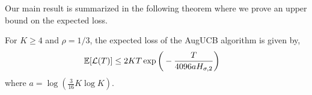 %


Our main result is summarized in the following theorem where we prove an  upper bound on the expected loss. 
\begin{theorem}
\label{Result:Theorem:1}
For $K\geq 4$ and
$\rho={1}/{3}$,
the expected loss of the AugUCB algorithm is given by,
\begin{align*}
\mathbb{E}[\mathcal{L}(T)]
& \leq 2KT
 \exp\bigg(- \frac{T}{4096 aH_{\sigma,2}} \bigg)
\end{align*}
where $a=\log(\frac{3}{16} K\log K)$.
\end{theorem}

